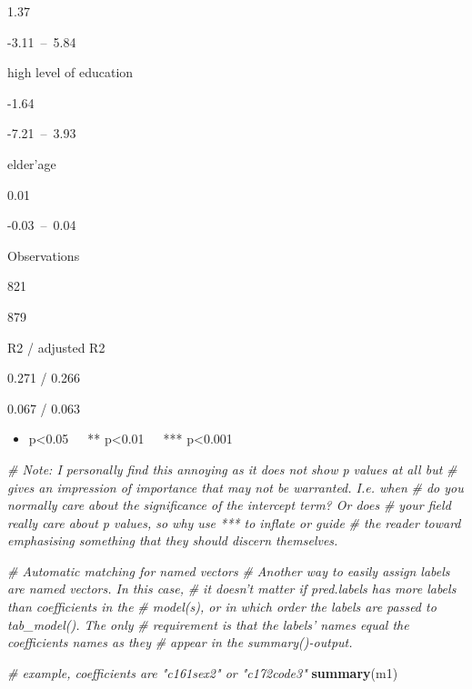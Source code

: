 \documentclass[]{article}
\newenvironment{Shaded}{\begin{snugshade}}{\end{snugshade}}
\newcommand{\KeywordTok}[1]{\textcolor[rgb]{0.13,0.29,0.53}{\textbf{#1}}}
\newcommand{\CommentTok}[1]{\textcolor[rgb]{0.56,0.35,0.01}{\textit{#1}}}
\newcommand{\NormalTok}[1]{#1}
\providecommand{\tightlist}{%
  \setlength{\itemsep}{0pt}\setlength{\parskip}{0pt}}
\begin{document}
1.37

-3.11~--~5.84

high level of education

-1.64

-7.21~--~3.93

elder'age

0.01

-0.03~--~0.04

Observations

821

879

R2 / adjusted R2

0.271 / 0.266

0.067 / 0.063

\begin{itemize}
\tightlist
\item
  p\textless{}0.05~~~** p\textless{}0.01~~~*** p\textless{}0.001
\end{itemize}

\begin{Shaded}
\begin{Highlighting}[]
\CommentTok{# Note: I personally find this annoying as it does not show p values at all but}
\CommentTok{# gives an impression of importance that may not be warranted.  I.e. when }
\CommentTok{# do you normally care about the significance of the intercept term?  Or does}
\CommentTok{# your field really care about p values, so why use *** to inflate or guide}
\CommentTok{# the reader toward emphasising something that they should discern themselves.}

\CommentTok{# Automatic matching for named vectors}
\CommentTok{# Another way to easily assign labels are named vectors. In this case,}
\CommentTok{# it doesn't matter if pred.labels has more labels than coefficients in the }
\CommentTok{# model(s), or in which order the labels are passed to tab_model(). The only}
\CommentTok{# requirement is that the labels' names equal the coefficients names as they}
\CommentTok{# appear in the summary()-output.}

\CommentTok{# example, coefficients are "c161sex2" or "c172code3"}
\KeywordTok{summary}\NormalTok{(m1)}
\end{Highlighting}
\end{Shaded}
\end{document}
